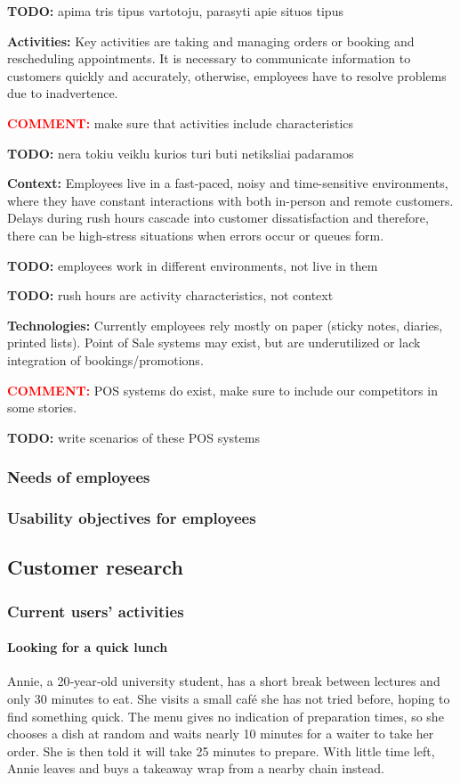 \documentclass[]{VUMIFTemplateClass}
\newcommand{\yellowcomment}[1]{%
    \begin{tcolorbox}[colback=yellow!80, colframe=yellow!80, arc=0pt, outer arc=0pt, boxrule=0pt, left=3pt, right=3pt, top=3pt, bottom=3pt]
        \textbf{\textcolor{red}{COMMENT:}} #1
    \end{tcolorbox}
}
\newcommand{\todocomment}[1]{%
    \begin{tcolorbox}[colback=red!20, colframe=red!60, arc=0pt, outer arc=0pt, boxrule=1pt, left=3pt, right=3pt, top=3pt, bottom=3pt]
        \textbf{\textcolor{orange!70!black}{TODO:}} #1
    \end{tcolorbox}
}
\newcommand{\subsubsubsection}[1]{\paragraph{#1}}
\begin{document}
    \todocomment{apima tris tipus vartotoju, parasyti apie situos tipus}

    \textbf{Activities:} Key activities are taking and managing orders or
    booking and rescheduling appointments. It is necessary to communicate
    information to customers quickly and accurately, otherwise, employees have
    to resolve problems due to inadvertence.

    \yellowcomment{make sure that activities include characteristics}
    \todocomment{nera tokiu veiklu kurios turi buti netiksliai padaramos}
    
    \textbf{Context:} Employees live in a fast-paced, noisy and time-sensitive
    environments, where they have constant interactions with both in-person and
    remote customers. Delays during rush hours cascade into customer
    dissatisfaction and therefore, there can be high-stress situations when
    errors occur or queues form.

    \todocomment{employees work in different environments, not live in them}
    \todocomment{rush hours are activity characteristics, not context}
    
    \textbf{Technologies:} Currently employees rely mostly on paper (sticky
    notes, diaries, printed lists). Point of Sale systems may exist, but are
    underutilized or lack integration of bookings/promotions.  
    \yellowcomment{POS systems do exist, make sure to include our competitors in some stories.}
    \todocomment{write scenarios of these POS systems}
\subsubsection{Needs of employees}

\subsubsection{Usability objectives for employees}


\subsection{Customer research}
\subsubsection{Current users' activities}

\subsubsubsection{Looking for a quick lunch}


Annie, a 20‑year‑old university student, has a short break between lectures and
only 30 minutes to eat. She visits a small café she has not tried before, hoping
to find something quick. The menu gives no indication of preparation times, so
she chooses a dish at random and waits nearly 10 minutes for a waiter to take
her order. She is then told it will take 25 minutes to prepare. With little time
left, Annie leaves and buys a takeaway wrap from a nearby chain instead.
\end{document}
